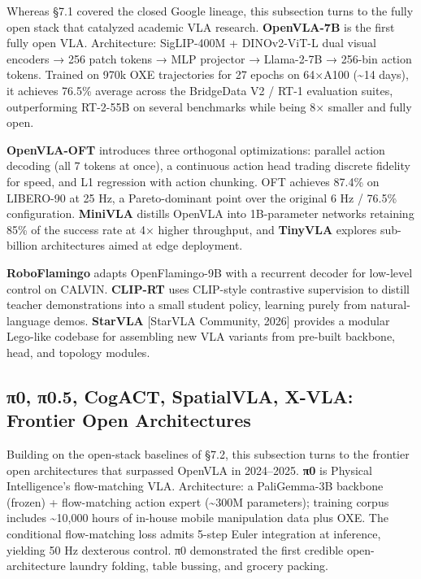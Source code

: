 \documentclass{article}
\begin{document}
Whereas §7.1 covered the closed Google lineage, this subsection turns to the fully open stack that catalyzed academic VLA research. \textbf{OpenVLA-7B} \cite{kim2024openvlaanopensourc} is the first fully open VLA. Architecture: SigLIP-400M + DINOv2-ViT-L dual visual encoders → 256 patch tokens → MLP projector → Llama-2-7B → 256-bin action tokens. Trained on 970k OXE trajectories for 27 epochs on 64×A100 (\textasciitilde14 days), it achieves 76.5\% average across the BridgeData V2 / RT-1 evaluation suites, outperforming RT-2-55B on several benchmarks while being 8× smaller and fully open.

\textbf{OpenVLA-OFT} \cite{kim2025finetuningvisionla} introduces three orthogonal optimizations: parallel action decoding (all 7 tokens at once), a continuous action head trading discrete fidelity for speed, and L1 regression with action chunking. OFT achieves 87.4\% on LIBERO-90 at 25 Hz, a Pareto-dominant point over the original 6 Hz / 76.5\% configuration. \textbf{MiniVLA} distills OpenVLA into 1B-parameter networks retaining 85\% of the success rate at 4× higher throughput, and \textbf{TinyVLA} explores sub-billion architectures aimed at edge deployment.

\textbf{RoboFlamingo} \cite{li2024cogactafoundationa} adapts OpenFlamingo-9B with a recurrent decoder for low-level control on CALVIN. \textbf{CLIP-RT} \cite{kang2025cliprtlearninglang} uses CLIP-style contrastive supervision to distill teacher demonstrations into a small student policy, learning purely from natural-language demos. \textbf{StarVLA} {[}StarVLA Community, 2026{]} provides a modular Lego-like codebase for assembling new VLA variants from pre-built backbone, head, and topology modules.

\subsection{π0, π0.5, CogACT, SpatialVLA, X-VLA: Frontier Open Architectures}\label{ux3c00-ux3c00.5-cogact-spatialvla-x-vla-frontier-open-architectures}

Building on the open-stack baselines of §7.2, this subsection turns to the frontier open architectures that surpassed OpenVLA in 2024--2025. \textbf{π0} \cite{black20240avisionlanguageac} is Physical Intelligence's flow-matching VLA. Architecture: a PaliGemma-3B backbone (frozen) + flow-matching action expert (\textasciitilde300M parameters); training corpus includes \textasciitilde10,000 hours of in-house mobile manipulation data plus OXE. The conditional flow-matching loss admits 5-step Euler integration at inference, yielding 50 Hz dexterous control. π0 demonstrated the first credible open-architecture laundry folding, table bussing, and grocery packing.
\end{document}
